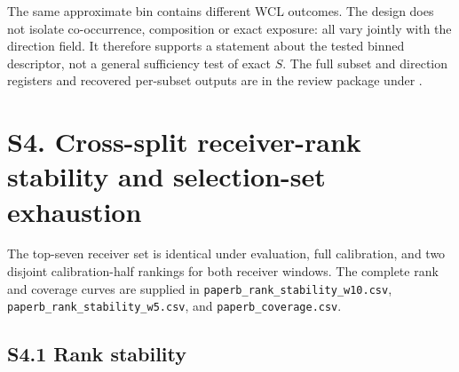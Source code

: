 \documentclass[journal,onecolumn,10pt]{IEEEtran}
\begin{document}
The same approximate bin contains different WCL outcomes. The design does not isolate co-occurrence, composition or exact exposure: all vary jointly with the direction field. It therefore supports a statement about the tested binned descriptor, not a general sufficiency test of exact $S$. The full subset and direction registers and recovered per-subset outputs are in the review package under .

\section*{S4. Cross-split receiver-rank stability and selection-set exhaustion}\label{s4.-cross-split-receiver-rank-stability-and-selection-set-exhaustion}

The top-seven receiver set is identical under evaluation, full calibration, and two disjoint calibration-half rankings for both receiver windows. The complete rank and coverage curves are supplied in \texttt{paperb\_rank\_stability\_w10.csv}, \texttt{paperb\_rank\_stability\_w5.csv}, and \texttt{paperb\_coverage.csv}.

\subsection*{S4.1 Rank stability}\label{s4.1-rank-stability}
\end{document}
